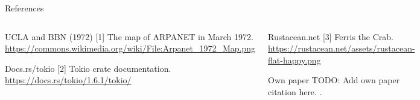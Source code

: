 \begin{frame}{References}
    \begin{columns}[c]


        \footnotesize {
            \begin{thebibliography}{9}

                 UCLA and BBN (1972) [1]
                \newblock The map of ARPANET in March 1972.
                \newblock \url{https://commons.wikimedia.org/wiki/File:Arpanet_1972_Map.png}

                 Docs.rs/tokio [2]
                \newblock Tokio crate documentation.
                \newblock \url{https://docs.rs/tokio/1.6.1/tokio/}

            \end{thebibliography}
        }


        \footnotesize {
            \begin{thebibliography}{9}

                 Rustacean.net [3]
                \newblock Ferris the Crab.
                \newblock \url{https://rustacean.net/assets/rustacean-flat-happy.png}

                 Own paper
                \newblock TODO: Add own paper citation here.
                \newblock .

            \end{thebibliography}
        }

    \end{columns}
\end{frame}
